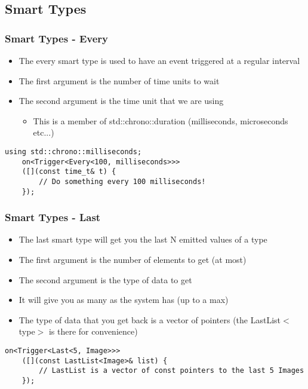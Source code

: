 \documentclass{beamer}
\begin{document}
\subsection{Smart Types}
\begin{frame}[fragile]
	\frametitle{Smart Types - Every}
	\begin{itemize}
		\item The every smart type is used to have an event triggered at a regular interval
		\item The first argument is the number of time units to wait
		\item The second argument is the time unit that we are using
		\begin{itemize}
			\item This is a member of std::chrono::duration (milliseconds, microseconds etc...)
		\end{itemize}
	\end{itemize}

	\begin{lstlisting}[language=nuclear]
	using std::chrono::milliseconds;
	on<Trigger<Every<100, milliseconds>>>
	([](const time_t& t) {
	    // Do something every 100 milliseconds!
	});
	\end{lstlisting}
\end{frame}

\begin{frame}[fragile]
	\frametitle{Smart Types - Last}
	\begin{itemize}
		\item The last smart type will get you the last N emitted values of a type
		\item The first argument is the number of elements to get (at most)
		\item The second argument is the type of data to get
		\item It will give you as many as the system has (up to a max)
		\item The type of data that you get back is a vector of pointers (the LastList$<$type$>$ is there for convenience)
	\end{itemize}

	\begin{lstlisting}[language=nuclear]
	on<Trigger<Last<5, Image>>>
	([](const LastList<Image>& list) {
	    // LastList is a vector of const pointers to the last 5 Images
	});
	\end{lstlisting}
\end{frame}
\end{document}
